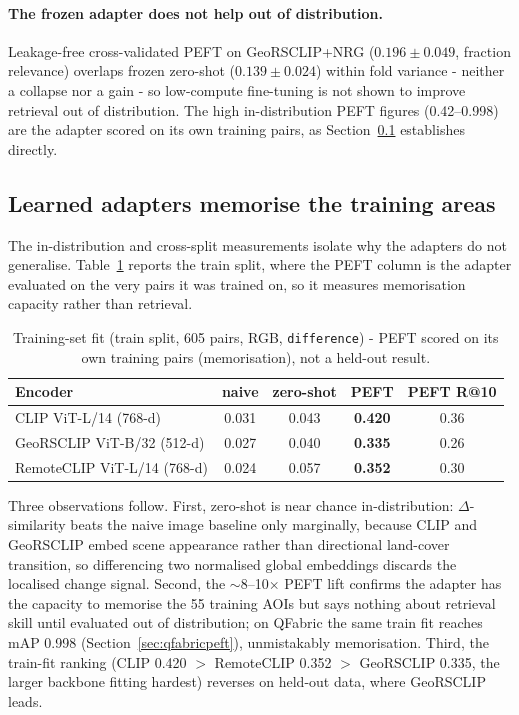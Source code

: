 \documentclass{article}
\begin{document}
\paragraph{The frozen adapter does not help out of distribution.}
Leakage-free cross-validated PEFT on GeoRSCLIP+NRG ($0.196 \pm 0.049$, fraction
relevance) overlaps frozen zero-shot ($0.139 \pm 0.024$) within fold variance -
neither a collapse nor a gain - so low-compute fine-tuning is not shown to
improve retrieval out of distribution. The high in-distribution PEFT figures
(0.42--0.998) are the adapter scored on its own training pairs, as
Section~\ref{sec:memorisation} establishes directly.

\subsection{Learned adapters memorise the training areas}
\label{sec:memorisation}

The in-distribution and cross-split measurements isolate why the adapters do not
generalise. Table~\ref{tab:indist} reports the train split, where the PEFT column
is the adapter evaluated on the very pairs it was trained on, so it measures
memorisation capacity rather than retrieval.

\begin{table}[H]
    \centering
    \caption{Training-set fit (train split, 605 pairs, RGB, \texttt{difference}) -
    PEFT scored on its own training pairs (memorisation), not a held-out result.}
    \label{tab:indist}
    \begin{tabular}{lcccc}
        \toprule
        \textbf{Encoder} & \textbf{naive} & \textbf{zero-shot} & \textbf{PEFT} & \textbf{PEFT R@10} \\
        \midrule
        CLIP ViT-L/14 (768-d)       & 0.031 & 0.043 & \textbf{0.420} & 0.36 \\
        GeoRSCLIP ViT-B/32 (512-d)  & 0.027 & 0.040 & \textbf{0.335} & 0.26 \\
        RemoteCLIP ViT-L/14 (768-d) & 0.024 & 0.057 & \textbf{0.352} & 0.30 \\
        \bottomrule
    \end{tabular}
\end{table}

Three observations follow. First, zero-shot is near chance in-distribution:
$\Delta$-similarity beats the naive image baseline only marginally, because CLIP
and GeoRSCLIP embed scene appearance rather than directional land-cover
transition, so differencing two normalised global embeddings discards the
localised change signal. Second, the $\sim$8--10$\times$ PEFT lift confirms the
adapter has the capacity to memorise the 55 training AOIs but says nothing about
retrieval skill until evaluated out of distribution; on QFabric the same train
fit reaches mAP 0.998 (Section~\ref{sec:qfabricpeft}), unmistakably memorisation.
Third, the train-fit ranking (CLIP 0.420 $>$ RemoteCLIP 0.352 $>$ GeoRSCLIP
0.335, the larger backbone fitting hardest) reverses on held-out data, where
GeoRSCLIP leads.
\end{document}
